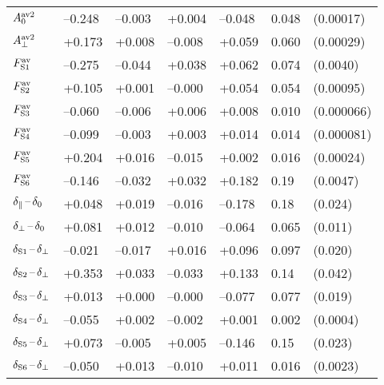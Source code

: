 \begin{table}[htbp]
\begin{tabular}{lllllll}
    \hline
    $\magzeroAvSq$  &  --0.248    &  --0.003  &   +0.004  &  --0.048  &  0.048  &  (0.00017)                    \\
    $\magperpAvSq$  &   +0.173    &   +0.008  &  --0.008  &   +0.059  &  0.060  &  (0.00029)                    \\
    $\FSAv[1]$      &  --0.275    &  --0.044  &   +0.038  &   +0.062  &  0.074  &  (0.0040)                     \\
    $\FSAv[2]$      &   +0.105    &   +0.001  &  --0.000  &   +0.054  &  0.054  &  (0.00095)                    \\
    $\FSAv[3]$      &  --0.060    &  --0.006  &   +0.006  &   +0.008  &  0.010  &  (0.000066)                   \\
    $\FSAv[4]$      &  --0.099    &  --0.003  &   +0.003  &   +0.014  &  0.014  &  (0.000081)                   \\
    $\FSAv[5]$      &   +0.204    &   +0.016  &  --0.015  &   +0.002  &  0.016  &  (0.00024)                    \\
    $\FSAv[6]$      &  --0.146    &  --0.032  &   +0.032  &   +0.182  &  0.19   &  (0.0047)                     \\
    \hline
    $\delparzero$   &   +0.048    &   +0.019  &  --0.016  &  --0.178  &  0.18   &  (0.024)                      \\
    $\delperpzero$  &   +0.081    &   +0.012  &  --0.010  &  --0.064  &  0.065  &  (0.011)                      \\
    $\delSperp[1]$  &  --0.021    &  --0.017  &   +0.016  &   +0.096  &  0.097  &  (0.020)                      \\
    $\delSperp[2]$  &   +0.353    &   +0.033  &  --0.033  &   +0.133  &  0.14   &  (0.042)                      \\
    $\delSperp[3]$  &   +0.013    &   +0.000  &  --0.000  &  --0.077  &  0.077  &  (0.019)                      \\
    $\delSperp[4]$  &  --0.055    &   +0.002  &  --0.002  &   +0.001  &  0.002  &  (0.0004)                     \\
    $\delSperp[5]$  &   +0.073    &  --0.005  &   +0.005  &  --0.146  &  0.15   &  (0.023)                      \\
    $\delSperp[6]$  &  --0.050    &   +0.013  &  --0.010  &   +0.011  &  0.016  &  (0.0023)                     \\
    \hline
  \end{tabular}
\end{table}


